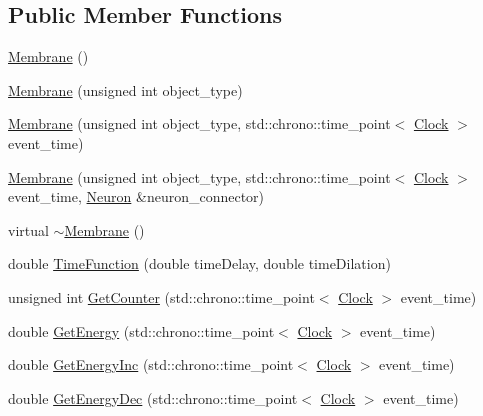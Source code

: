 \subsection*{Public Member Functions}
\begin{DoxyCompactItemize}
\item 
\mbox{\hyperlink{class_membrane_ae3db1e55d9a535226bfd41c2a9ac1f0c}{Membrane}} ()
\item 
\mbox{\hyperlink{class_membrane_a9e45fcb5a4e791f2697fce4d9fa78a3f}{Membrane}} (unsigned int object\+\_\+type)
\item 
\mbox{\hyperlink{class_membrane_afeb8292866a69bdc2b9be6dcd902b519}{Membrane}} (unsigned int object\+\_\+type, std\+::chrono\+::time\+\_\+point$<$ \mbox{\hyperlink{universe_8h_a0ef8d951d1ca5ab3cfaf7ab4c7a6fd80}{Clock}} $>$ event\+\_\+time)
\item 
\mbox{\hyperlink{class_membrane_a8d61894d90a7f63e427cd8b1a5eca380}{Membrane}} (unsigned int object\+\_\+type, std\+::chrono\+::time\+\_\+point$<$ \mbox{\hyperlink{universe_8h_a0ef8d951d1ca5ab3cfaf7ab4c7a6fd80}{Clock}} $>$ event\+\_\+time, \mbox{\hyperlink{class_neuron}{Neuron}} \&neuron\+\_\+connector)
\item 
virtual \mbox{\hyperlink{class_membrane_a8765daf8038c1e992e3ea3752db0042f}{$\sim$\+Membrane}} ()
\item 
double \mbox{\hyperlink{class_membrane_a8c3593b0747495c412bf2d99b7b10104}{Time\+Function}} (double time\+Delay, double time\+Dilation)
\item 
unsigned int \mbox{\hyperlink{class_membrane_a85f8b2633ff32f79b6fbb466ce690858}{Get\+Counter}} (std\+::chrono\+::time\+\_\+point$<$ \mbox{\hyperlink{universe_8h_a0ef8d951d1ca5ab3cfaf7ab4c7a6fd80}{Clock}} $>$ event\+\_\+time)
\item 
double \mbox{\hyperlink{class_membrane_a50d39c596daa7af8da7dd7215d3a32ba}{Get\+Energy}} (std\+::chrono\+::time\+\_\+point$<$ \mbox{\hyperlink{universe_8h_a0ef8d951d1ca5ab3cfaf7ab4c7a6fd80}{Clock}} $>$ event\+\_\+time)
\item 
double \mbox{\hyperlink{class_membrane_a00e038f0023186139467d490c6cd38a3}{Get\+Energy\+Inc}} (std\+::chrono\+::time\+\_\+point$<$ \mbox{\hyperlink{universe_8h_a0ef8d951d1ca5ab3cfaf7ab4c7a6fd80}{Clock}} $>$ event\+\_\+time)
\item 
double \mbox{\hyperlink{class_membrane_a874068c028004d4dde7ec41d999872eb}{Get\+Energy\+Dec}} (std\+::chrono\+::time\+\_\+point$<$ \mbox{\hyperlink{universe_8h_a0ef8d951d1ca5ab3cfaf7ab4c7a6fd80}{Clock}} $>$ event\+\_\+time)
\item 

\end{DoxyCompactItemize}
